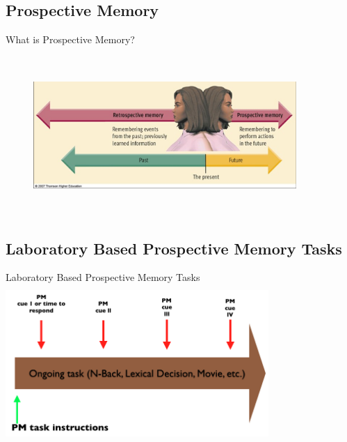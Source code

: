 \documentclass[xcolor=x11names,compress]{beamer}
\renewcommand{\(}{\begin{columns}}
\renewcommand{\)}{\end{columns}}
\newcommand{\<}[1]{\begin{column}{#1}}
\renewcommand{\>}{\end{column}}
\begin{document}
\subsection{Prospective Memory}
\begin{frame}{What is Prospective Memory?}
\begin{figure}[hbtp]
\includegraphics[width=10cm, height=6cm]{INTRO.png}
\centering
\end{figure}



\end{frame}

\subsection{Laboratory Based Prospective Memory Tasks}
\begin{frame}{Laboratory Based Prospective Memory Tasks}
\includegraphics[width=10cm, height=6cm]{LAB.png} 
\centering
\end{frame}
\end{document}
